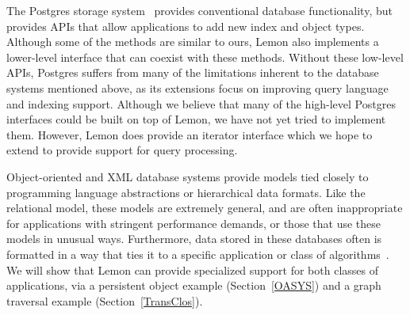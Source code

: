 \documentclass[10pt,letterpaper,twocolumn,english]{article}
\newcommand{\yad}{Lemon\xspace}
\begin{document}
The Postgres storage system~\cite{postgres} provides conventional
database functionality, but provides APIs that allow applications to 
add new index and object types.~\cite{newTypes}  Although some of the methods are
similar to ours, \yad also implements a lower-level
interface that can coexist with these methods.  Without these
low-level APIs, Postgres suffers from many of the limitations inherent
to the database systems mentioned above, as its extensions focus on
improving
query language and indexing support.
Although we
believe that many of the high-level Postgres interfaces could be built
on top of \yad, we have not yet tried to implement them.
However, \yad does provide an iterator interface which we hope to
extend to provide support for query processing.

Object-oriented and XML database systems provide models tied closely
to programming language abstractions or hierarchical data formats.
Like the relational model, these models are extremely general, and are
often inappropriate for applications with stringent performance
demands, or those that use  these models in unusual ways.  Furthermore, data stored in these databases
often is formatted in a way that ties it to a specific application or
class of algorithms~\cite{lamb}.  We will show that \yad can provide 
specialized support for both classes of applications, via a persistent 
object example (Section~\ref{OASYS}) and a graph traversal example 
(Section~\ref{TransClos}).

\end{document}
